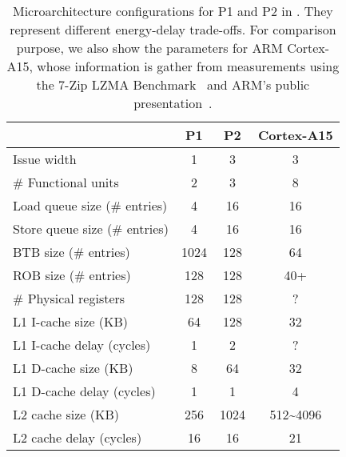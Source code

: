 
\begin{table}[p]
\large
\centering
\captionsetup{width=.9\columnwidth}
\caption{Microarchitecture configurations for P1 and P2 in
. They represent different energy-delay trade-offs. For comparison purpose, we also show the parameters for ARM Cortex-A15, whose information is gather from measurements using the 7-Zip LZMA Benchmark~\cite{7cpu-a15} and ARM's public presentation~\cite{a15-slide}.}
\renewcommand*{\arraystretch}{1.4}
\renewcommand*{\tabcolsep}{15pt}
\resizebox{.9\columnwidth}{!}
{
	\begin{tabular}{l c c c}
	\toprule[0.15em]
        ~      & \bigstrut\textbf{P1} & \bigstrut\textbf{P2} & \bigstrut\textbf{Cortex-A15}\\
	\midrule[0.05em]
        Issue width						&	1		&	3	&	3	\\
        \# Functional units				&	2		&	3	&	8	\\
        Load queue size (\# entries)		&	4		&	16	&	16	\\
        Store queue size (\# entries)	&	4		&	16	&	16	\\
        BTB size (\# entries)   &       1024    &       128 &   64       \\
        ROB size (\# entries)			&	128		&	128	&	40+	\\
        \# Physical registers			&	128		&	128	&	?	\\
        L1 I-cache size (KB)				&	64		&	128	&	32	\\
        L1 I-cache delay (cycles)		&	1		&	2	&	?	\\
        L1 D-cache size (KB)				&	8		&	64	&	32	\\
        L1 D-cache delay (cycles)		&	1		&	1	&	4	\\
        L2 cache size (KB)				&	256&	1024	&	512\textasciitilde4096	\\
        L2 cache delay (cycles)			&	16		&	16	&	21	\\
	\bottomrule[0.15em]
    \end{tabular}
}
\label{tab:dse:ednp}
\end{table}
